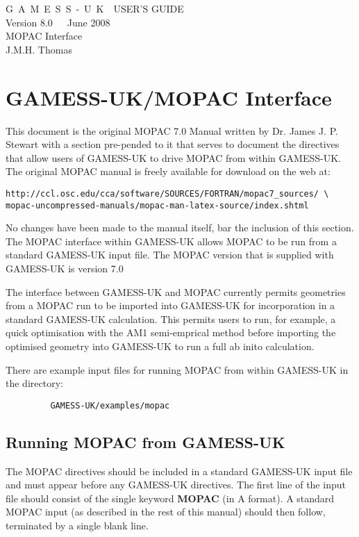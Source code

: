 \documentclass[11pt]{book}
\begin{document}
\begin{flushleft}
{\huge G~A~M~E~S~S~-~U~K~~USER'S GUIDE}\\[0.2in]
{\huge Version 8.0~~~June 2008}\\ [.2in]
{\huge MOPAC Interface}\\
\vspace{.1in}
{\large J.M.H. Thomas}\\[0.2in]
\vspace{.2in}
\end{flushleft}

\section{GAMESS-UK/MOPAC Interface}
 This document is the original MOPAC 7.0 Manual written by Dr. James
 J. P. Stewart with a section pre-pended to it that serves to document
 the directives that allow users of GAMESS-UK to drive MOPAC from
 within GAMESS-UK. The original MOPAC manual is freely available for
 download on the web at:

{
\footnotesize
\begin{verbatim}
http://ccl.osc.edu/cca/software/SOURCES/FORTRAN/mopac7_sources/ \
mopac-uncompressed-manuals/mopac-man-latex-source/index.shtml
\end{verbatim}
}

No changes have been made to the manual itself, bar the inclusion of
this section.\\

The MOPAC interface within GAMESS-UK allows MOPAC to be run from a
standard GAMESS-UK input file. The MOPAC version that is supplied with
GAMESS-UK is version 7.0

The interface between GAMESS-UK and MOPAC currently permits geometries
from a MOPAC run to be imported into GAMESS-UK for incorporation in a
standard GAMESS-UK calculation. This permits users to run, for
example, a quick optimisation with the AM1 semi-emprical method before
importing the optimised geometry into GAMESS-UK to run a full ab inito
calculation.

There are example input files for running MOPAC from within GAMESS-UK in the
directory:

{
\footnotesize
\begin{verbatim}
         GAMESS-UK/examples/mopac
\end{verbatim}
}

\subsection{Running MOPAC from GAMESS-UK}
The MOPAC directives should be included in a standard GAMESS-UK
input file and must appear before any GAMESS-UK directives. The first
line of the input file should consist of the single keyword
\textbf{MOPAC} (in A format). A standard MOPAC input (as described in
the rest of this manual) should then follow, terminated by a single
blank line.
\end{document}
